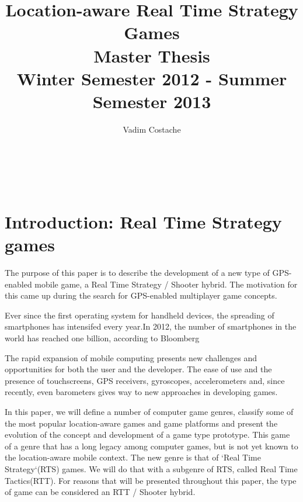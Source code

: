 \documentclass{article}
\title{Location-aware Real Time Strategy Games \\ Master Thesis \\
Winter Semester 2012 - Summer Semester 2013}
\author{Vadim Costache} %
\begin{document}
\maketitle %

\setlength\parindent{0pt} %

\renewcommand{\labelenumi}{\alph{enumi}.} %

\newcommand{\superscript}[1]{\ensuremath{^{\textrm{#1}}}}
\newcommand{\subscript}[1]{\ensuremath{_{\textrm{#1}}}}



   
\begin{verbatim}



\end{verbatim}
     
\tableofcontents

\newpage


\section{Introduction: Real Time Strategy games}

The purpose of this paper is to describe the development of a new type of
GPS-enabled mobile game, a Real Time Strategy / Shooter hybrid. The motivation
for this came up during the search for GPS-enabled multiplayer game concepts.

Ever since the first operating system for handheld devices, the spreading of
smartphones has intensifed every year.In 2012, the number of smartphones in the
world has reached one billion, according to Bloomberg\cite{bloomberg} \newline

The rapid expansion of mobile computing presents new challenges and
opportunities for both the user and the developer. The ease of use and the
presence of touchscreens, GPS receivers, gyroscopes, accelerometers and, since
recently, even barometers gives way to new approaches in developing
games.\newline

In this paper, we will define a number of computer game genres, classify some of
the most popular location-aware games and game platforms and present the
evolution of the concept and development of a game type prototype. This game of
a genre that has a long legacy among computer games, but is not yet known to the
location-aware mobile context. The new genre is that of `Real Time
Strategy`(RTS)\cite{rts} games. We will do that with a subgenre
of RTS, called Real Time Tactics(RTT)\cite{rttvsrts}. For reasons that will be
presented throughout this paper, the type of game can be considered an
RTT / Shooter hybrid. \newline
\end{document}
